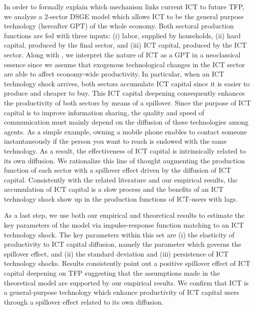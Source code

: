 \documentclass[12pt]{article}
\begin{document}
In order to formally explain which mechanism links current ICT to future TFP, we analyze a 2-sector DSGE model which allows ICT to be the general purpose technology (hereafter GPT) of the whole economy. Both sectoral production functions are fed with three inputs: (i) labor, supplied by households, (ii) hard capital, produced by the final sector, and (iii) ICT capital, produced by the ICT sector. Along with \cite{basu2007information}, we interpret the nature of ICT as a GPT in a neoclassical essence since we assume that exogenous technological changes in the ICT sector are able to affect economy-wide productivity. In particular, when an ICT technology shock arrives, both sectors accumulate ICT capital since it is easier to produce and cheaper to buy. This ICT capital deepening consequently enhances the productivity of both sectors by means of a spillover. Since the purpose of ICT capital is to improve information sharing, the quality and speed of communication must mainly depend on the diffusion of these technologies among agents. As a simple example, owning a mobile phone enables to contact someone instantaneously if the person you want to reach is endowed with the same technology. As a result, the effectiveness of ICT capital is intrinsically related to its own diffusion. We rationalize this line of thought augmenting the production function of each sector with a spillover effect driven by the diffusion of ICT capital. Consistently with the related literature and our empirical results, the accumulation of ICT capital is a slow process and the benefits of an ICT technology shock show up in the production functions of ICT-users with lags.

As a last step, we use both our empirical and theoretical results to estimate the key parameters of the model via impulse-response function matching to an ICT technology shock. The key parameters within this set are (i) the elasticity of productivity to ICT capital diffusion, namely the parameter which governs the spillover effect, and (ii) the standard deviation and (iii) persistence of ICT technology shocks. Results consistently point out a positive spillover effect of ICT capital deepening on TFP suggesting that the assumptions made in the theoretical model are supported by our empirical results. We confirm that ICT is a general-purpose technology which enhance productivity of ICT capital users through a spillover effect related to its own diffusion.
\end{document}
